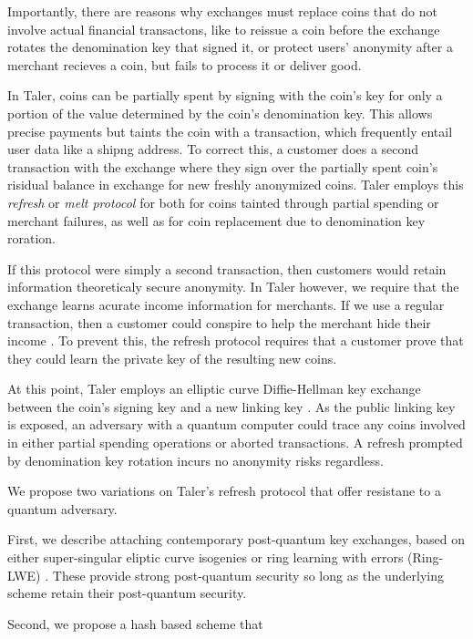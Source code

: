 \documentclass{llncs}
\begin{document}
Importantly, there are reasons why exchanges must replace coins that
do not involve actual financial transactons, like to reissue a coin
before the exchange rotates the denomination key that signed it, or
protect users' anonymity after a merchant recieves a coin, but fails
to process it or deliver good.

In Taler, coins can be partially spent by signing with the coin's key
for only a portion of the value determined by the coin's denomination
key.  This allows precise payments but taints the coin with a
transaction,  which frequently entail user data like a shipng address.  
To correct this, a customer does a second transaction with the exchange
where they sign over the partially spent coin's risidual balance
in exchange for new freshly anonymized coins.  
Taler employs this {\em refresh} or {\em melt protocol} for
both for coins tainted through partial spending or merchant failures,
as well as for coin replacement due to denomination key roration.

If this protocol were simply a second transaction, then customers
would retain information theoreticaly secure anonymity.  
In Taler however, we require that the exchange learns acurate income
information for merchants.  If we use a regular transaction, then
a customer could conspire to help the merchant hide their income
\cite[]{Taler??}.
To prevent this, the refresh protocol requires that a customer prove
that they could learn the private key of the resulting new coins.

At this point, Taler employs an elliptic curve Diffie-Hellman key
exchange between the coin's signing key and a new linking key 
\cite[??]{Taler??}.  As the public linking key is exposed,
an adversary with a quantum computer could trace any coins involved
in either partial spending operations or aborted transactions.
A refresh prompted by denomination key rotation incurs no anonymity
risks regardless.

\smallskip

We propose two variations on Taler's refresh protocol that offer
resistane to a quantum adversary.

First, we describe attaching contemporary post-quantum key exchanges,
based on either super-singular eliptic curve isogenies \cite{SIDH} or
ring learning with errors (Ring-LWE) \cite{Peikert14,NewHope}.
These provide strong post-quantum security so long as the underlying
scheme retain their post-quantum security.

Second, we propose a hash based scheme that 
\end{document}
